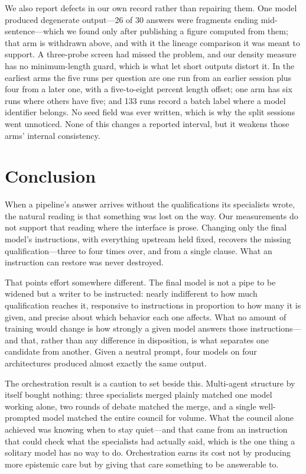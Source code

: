 \documentclass[11pt]{article}
\begin{document}
We also report defects in our own record rather than repairing them. One
model produced degenerate output---26 of 30 answers were fragments ending
mid-sentence---which we found only after publishing a figure computed from
them; that arm is withdrawn above, and with it the lineage comparison it was
meant to support. A three-probe screen had missed the problem, and our density
measure has no minimum-length guard, which is what let short outputs distort
it. In the earliest arms the five runs per question are one run from an
earlier session plus four from a later one, with a five-to-eight percent
length offset; one arm has six runs where others have five; and 133 runs
record a batch label where a model identifier belongs. No seed field was ever
written, which is why the split sessions went unnoticed. None of this changes
a reported interval, but it weakens those arms' internal consistency.

\section{Conclusion}
When a pipeline's answer arrives without the qualifications its specialists
wrote, the natural reading is that something was lost on the way. Our
measurements do not support that reading where the interface is prose.
Changing only the final model's instructions, with everything upstream held
fixed, recovers the missing qualification---three to four times over, and from
a single clause. What an instruction can restore was never destroyed.

That points effort somewhere different. The final model is not a pipe to be
widened but a writer to be instructed: nearly indifferent to how much
qualification reaches it, responsive to instructions in proportion to how many
it is given, and precise about which behavior each one affects. What no amount
of training would change is how strongly a given model answers those
instructions---and that, rather than any difference in disposition, is what
separates one candidate from another. Given a neutral prompt, four models on
four architectures produced almost exactly the same output.

The orchestration result is a caution to set beside this. Multi-agent
structure by itself bought nothing: three specialists merged plainly matched
one model working alone, two rounds of debate matched the merge, and a single
well-prompted model matched the entire council for volume. What the council
alone achieved was knowing when to stay quiet---and that came from an
instruction that could check what the specialists had actually said, which is
the one thing a solitary model has no way to do. Orchestration earns its cost
not by producing more epistemic care but by giving that care something to be
answerable to.
\end{document}
